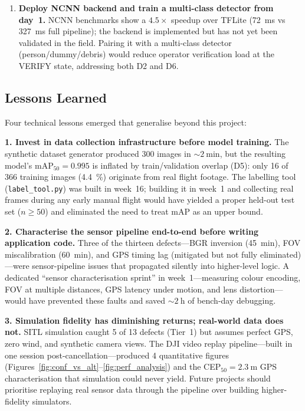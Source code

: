 \begin{enumerate}
    \item \textbf{Deploy NCNN backend and train a multi-class detector from day~1.} NCNN benchmarks show a $4.5\times$ speedup over TFLite (\SI{72}{\milli\second} vs \SI{327}{\milli\second} full pipeline); the backend is implemented but has not yet been validated in the field. Pairing it with a multi-class detector (person/dummy/debris) would reduce operator verification load at the VERIFY state, addressing both D2 and D6.
\end{enumerate}

\subsection{Lessons Learned}\label{app:lessons-learned}

Four technical lessons emerged that generalise beyond this project:

\textbf{1. Invest in data collection infrastructure before model training.}
The synthetic dataset generator produced 300 images in ${\sim}\SI{2}{\minute}$, but the resulting model's mAP$_{50}{=}0.995$ is inflated by train/validation overlap (D5): only 16 of 366 training images (\SI{4.4}{\percent}) originate from real flight footage. The labelling tool (\texttt{label\_tool.py}) was built in week~16; building it in week~1 and collecting real frames during any early manual flight would have yielded a proper held-out test set ($n \geq 50$) and eliminated the need to treat mAP as an upper bound.

\textbf{2. Characterise the sensor pipeline end-to-end before writing application code.}
Three of the thirteen defects---BGR inversion (\SI{45}{\minute}), FOV miscalibration (\SI{60}{\minute}), and GPS timing lag (mitigated but not fully eliminated)---were sensor-pipeline issues that propagated silently into higher-level logic. A dedicated ``sensor characterisation sprint'' in week~1---measuring colour encoding, FOV at multiple distances, GPS latency under motion, and lens distortion---would have prevented these faults and saved ${\sim}\SI{2}{\hour}$ of bench-day debugging.

\textbf{3. Simulation fidelity has diminishing returns; real-world data does not.}
SITL simulation caught 5 of 13 defects (Tier~1) but assumes perfect GPS, zero wind, and synthetic camera views. The DJI video replay pipeline---built in one session post-cancellation---produced 4 quantitative figures (Figures~\ref{fig:conf_vs_alt}--\ref{fig:perf_analysis}) and the CEP$_{50}{=}\SI{2.3}{\metre}$ GPS characterisation that simulation could never yield. Future projects should prioritise replaying real sensor data through the pipeline over building higher-fidelity simulators.

